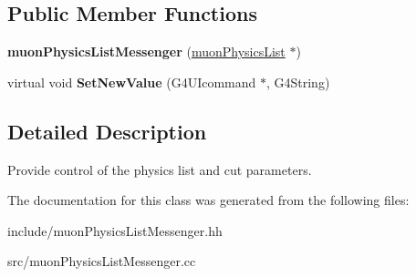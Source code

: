 \subsection*{Public Member Functions}
\begin{DoxyCompactItemize}
\item 
\mbox{\label{classmuonPhysicsListMessenger_a11858a3a5031e4e9b36a2f92906d992f}} 
{\bfseries muon\+Physics\+List\+Messenger} (\hyperlink{classmuonPhysicsList}{muon\+Physics\+List} $\ast$)
\item 
\mbox{\label{classmuonPhysicsListMessenger_a89644cda40ed2e4fa88f2344a7bbedc4}} 
virtual void {\bfseries Set\+New\+Value} (G4\+U\+Icommand $\ast$, G4\+String)
\end{DoxyCompactItemize}


\subsection{Detailed Description}
Provide control of the physics list and cut parameters. 

The documentation for this class was generated from the following files\+:\begin{DoxyCompactItemize}
\item 
include/muon\+Physics\+List\+Messenger.\+hh\item 
src/muon\+Physics\+List\+Messenger.\+cc\end{DoxyCompactItemize}
